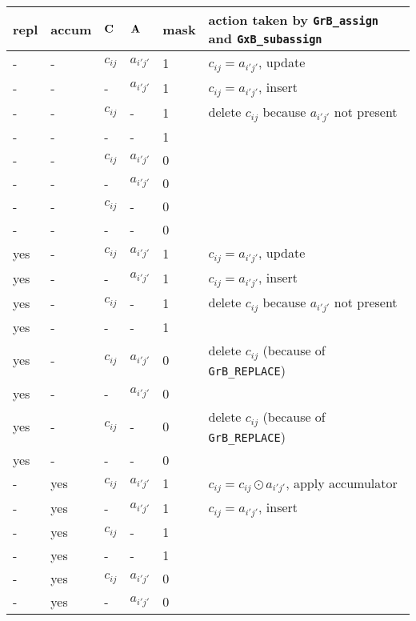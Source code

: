\documentclass[12pt]{article}
\begin{document}
{\begin{table}
{\small
\begin{tabular}{lllll|l}
\hline
repl & accum & ${\bf C}$ & ${\bf A}$ & mask & action taken by \verb'GrB_assign' and \verb'GxB_subassign'\\
\hline
    -  &-   & $c_{ij}$ & $a_{i'j'}$  & 1    &  $c_{ij} = a_{i'j'}$, update \\
    -  &-   &  -       & $a_{i'j'}$  & 1    &  $c_{ij} = a_{i'j'}$, insert \\
    -  &-   & $c_{ij}$ &  -          & 1    &  delete $c_{ij}$ because $a_{i'j'}$ not present \\
    -  &-   &  -       &  -          & 1    &   \\
    -  &-   & $c_{ij}$ & $a_{i'j'}$  & 0    &   \\
    -  &-   &  -       & $a_{i'j'}$  & 0    &   \\
    -  &-   & $c_{ij}$ &  -          & 0    &   \\
    -  &-   &  -       &  -          & 0    &   \\
\hline
    yes&-   & $c_{ij}$ & $a_{i'j'}$  & 1    &  $c_{ij} = a_{i'j'}$, update \\
    yes&-   &  -       & $a_{i'j'}$  & 1    &  $c_{ij} = a_{i'j'}$, insert \\
    yes&-   & $c_{ij}$ &  -          & 1    &  delete $c_{ij}$ because $a_{i'j'}$ not present \\
    yes&-   &  -       &  -          & 1    &   \\
    yes&-   & $c_{ij}$ & $a_{i'j'}$  & 0    &  delete $c_{ij}$  (because of \verb'GrB_REPLACE') \\
    yes&-   &  -       & $a_{i'j'}$  & 0    &   \\
    yes&-   & $c_{ij}$ &  -          & 0    &  delete $c_{ij}$  (because of \verb'GrB_REPLACE') \\
    yes&-   &  -       &  -          & 0    &   \\
\hline
    -  &yes & $c_{ij}$ & $a_{i'j'}$  & 1    &  $c_{ij} = c_{ij} \odot a_{i'j'}$, apply accumulator \\
    -  &yes &  -       & $a_{i'j'}$  & 1    &  $c_{ij} = a_{i'j'}$, insert \\
    -  &yes & $c_{ij}$ &  -          & 1    &   \\
    -  &yes &  -       &  -          & 1    &   \\
    -  &yes & $c_{ij}$ & $a_{i'j'}$  & 0    &   \\
    -  &yes &  -       & $a_{i'j'}$  & 0    &   \\

\end{tabular}}
\end{table}}
\end{document}
